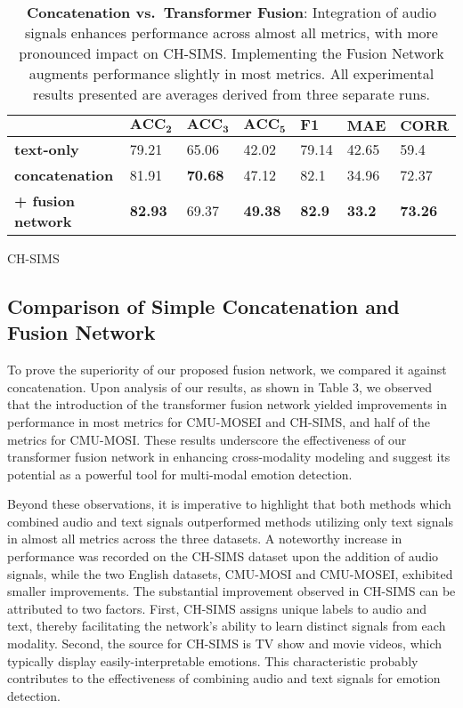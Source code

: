 \documentclass[11pt]{article}
\begin{document}
\begin{table*}
\begin{subtable}{\textwidth}
\centering
\small
\setlength{\tabcolsep}{3pt}
\renewcommand{\arraystretch}{1.2}
\begin{tabular}{lllllll}
\hline
 & $\mathbf{ACC_2}$ & $\mathbf{ACC_3}$ & $\mathbf{ACC_5}$ & $\mathbf{F1}$ & $\mathbf{MAE}$ & $\mathbf{CORR}$ \\ \hline
\textbf{text-only} & 79.21 & 65.06 & 42.02 & 79.14 & 42.65 & 59.4 \\ \hline
\textbf{concatenation} & 81.91 & \textbf{70.68} & 47.12 & 82.1 & 34.96 & 72.37 \\ 
\textbf{+ fusion network} & \textbf{82.93} & 69.37 & \textbf{49.38} & \textbf{82.9} & \textbf{33.2} & \textbf{73.26} \\ \hline
\end{tabular}
\caption{CH-SIMS}
\label{tab:CH-SIMS2}
\end{subtable}
\caption{\textbf{Concatenation vs.~Transformer Fusion}: Integration of audio signals enhances performance across almost all metrics, with more pronounced impact on CH-SIMS. Implementing the Fusion Network augments performance slightly in most metrics. All experimental results presented are averages derived from three separate runs.}
\label{tab:Performance3}
\end{table*}

\subsection{Comparison of Simple Concatenation and Fusion Network}
To prove the superiority of our proposed fusion network, we compared it against concatenation. Upon analysis of our results, as shown in Table 3, we observed that the introduction of the transformer fusion network yielded improvements in performance in most metrics for CMU-MOSEI and CH-SIMS, and half of the metrics for CMU-MOSI. These results underscore the effectiveness of our transformer fusion network in enhancing cross-modality modeling and suggest its potential as a powerful tool for multi-modal emotion detection.

Beyond these observations, it is imperative to highlight that both methods which combined audio and text signals outperformed methods utilizing only text signals in almost all metrics across the three datasets. A noteworthy increase in performance was recorded on the CH-SIMS dataset upon the addition of audio signals, while the two English datasets, CMU-MOSI and CMU-MOSEI, exhibited smaller improvements. The substantial improvement observed in CH-SIMS can be attributed to two factors. First, CH-SIMS assigns unique labels to audio and text, thereby facilitating the network's ability to learn distinct signals from each modality. Second, the source for CH-SIMS  is TV show and movie videos, which typically display easily-interpretable emotions. This characteristic probably contributes to the effectiveness of combining audio and text signals for emotion detection.
\end{document}
